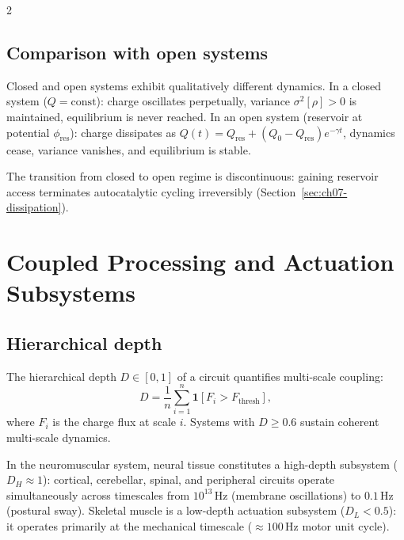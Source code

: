 \begin{multicols}{2}
\subsection{Comparison with open systems}

\begin{theorem}
\label{thm:ch07-closedopen}
Closed and open systems exhibit qualitatively different dynamics.
In a closed system ($Q = \mathrm{const}$): charge oscillates perpetually,
variance $\sigma^2[\rho] > 0$ is maintained, equilibrium is never reached.
In an open system (reservoir at potential $\phi_{\mathrm{res}}$): charge
dissipates as $Q(t) = Q_{\mathrm{res}} + (Q_0-Q_{\mathrm{res}})e^{-\gamma t}$,
dynamics cease, variance vanishes, and equilibrium is stable.
\end{theorem}

The transition from closed to open regime is discontinuous: gaining reservoir
access terminates autocatalytic cycling irreversibly
(Section~\ref{sec:ch07-dissipation}).

\section{Coupled Processing and Actuation Subsystems}
\label{sec:ch07-coupled}

\subsection{Hierarchical depth}

\begin{definition}
\label{def:ch07-depth}
The hierarchical depth $D \in [0,1]$ of a circuit quantifies multi-scale
coupling:
\begin{equation}
  D = \frac{1}{n}\sum_{i=1}^{n}\mathbf{1}[F_i > F_{\mathrm{thresh}}],
  \label{eq:ch07-depth}
\end{equation}
where $F_i$ is the charge flux at scale $i$.  Systems with $D \ge 0.6$
sustain coherent multi-scale dynamics.
\end{definition}

In the neuromuscular system, neural tissue constitutes a high-depth
subsystem ($D_H \approx 1$): cortical, cerebellar, spinal, and peripheral
circuits operate simultaneously across timescales from $10^{13}$\,Hz
(membrane oscillations) to $0.1$\,Hz (postural sway).  Skeletal muscle is
a low-depth actuation subsystem ($D_L < 0.5$): it operates primarily at
the mechanical timescale ($\approx 100$\,Hz motor unit cycle).


\end{multicols}
